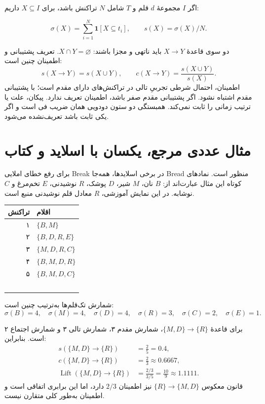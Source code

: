 اگر $I$ مجموعهٔ $d$ قلم و $T$ شامل $N$ تراکنش باشد، برای $X\subseteq I$ داریم:

\[\sigma(X)=\sum_{i=1}^{N}\mathbf1[X\subseteq t_i],\qquad s(X)=\sigma(X)/N.\]

دو سوی قاعدهٔ $X\to Y$ باید ناتهی و مجزا باشند: $X\cap Y=\varnothing$. تعریف پشتیبانی و اطمینان چنین است:
\[s(X\to Y)=s(X\cup Y),\qquad c(X\to Y)=\frac{s(X\cup Y)}{s(X)}.\]
اطمینان، احتمال شرطی تجربیِ تالی در تراکنش‌های دارای مقدم است؛ با پشتیبانی مقدم اشتباه نشود. اگر پشتیبانی مقدم صفر باشد، اطمینان تعریف ندارد. پیکان، علت یا ترتیب زمانی را ثابت نمی‌کند. همبستگی دو ستون دودویی همان ضریب فی است و اگر یکی ثابت باشد تعریف‌نشده می‌شود.

\section{مثال عددی مرجع، یکسان با اسلاید و کتاب}

برای رفع خطای املایی Break در برخی اسلایدها، همه‌جا Bread منظور است. نمادهای کوتاه این مثال عبارت‌اند از: $B$ نان، $M$ شیر، $D$ پوشک، $R$ نوشیدنی، $E$ تخم‌مرغ و $C$ نوشابه. در این نمایش آموزشی، $R$ معادل قلم نوشیدنی منبع است.

{\def\LTcaptype{table} %
\begin{longtable}[]{@{}rl@{}}
\toprule\noalign{}
تراکنش & اقلام \\
\midrule\noalign{}
\endhead
\bottomrule\noalign{}
\endlastfoot
۱ & $\{B,M\}$ \\\
۲ & $\{B,D,R,E\}$ \\\
۳ & $\{M,D,R,C\}$ \\\
۴ & $\{B,M,D,R\}$ \\\
۵ & $\{B,M,D,C\}$ \\\
\end{longtable}
}

شمارش تک‌قلم‌ها به‌ترتیب چنین است:
\[\sigma(B)=4,\quad\sigma(M)=4,\quad\sigma(D)=4,\quad\sigma(R)=3,\quad\sigma(C)=2,\quad\sigma(E)=1.\]

برای قاعدهٔ $\{M,D\}\to\{R\}$، شمارش مقدم ۳، شمارش تالی ۳ و شمارش اجتماع ۲ است. بنابراین:
\begin{align*}
s(\{M,D\}\to\{R\})&=\frac25=0.4,\\
c(\{M,D\}\to\{R\})&=\frac23\approx0.6667,\\
\operatorname{Lift}(\{M,D\}\to\{R\})&=\frac{2/3}{3/5}=\frac{10}{9}\approx1.1111.
\end{align*}
قانون معکوس $\{R\}\to\{M,D\}$ نیز اطمینان $2/3$ دارد، اما این برابری اتفاقی است و اطمینان به‌طور کلی متقارن نیست.

